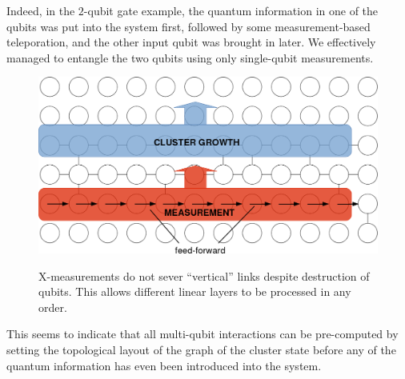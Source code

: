 \documentclass[twocolumn]{Styles/IEEEtran11}
\begin{document}
Indeed, in the $2$-qubit gate example, the quantum information in one of the qubits was put into the system first, followed by some measurement-based teleporation, and the other input qubit was brought in later. We effectively managed to entangle the two qubits using only single-qubit measurements.

\begin{figure}[hbt]
  \centering
  \includegraphics[width=\linewidth]{Images/parallel02.png}
  \label{parallelfig2}
  \caption{X-measurements do not sever ``vertical'' links despite destruction of qubits. This allows different linear layers to be processed in any order.}
\end{figure}

This seems to indicate that all multi-qubit interactions can be pre-computed by setting the topological layout of the graph of the cluster state before any of the quantum information has even been introduced into the system. 

\end{document}
